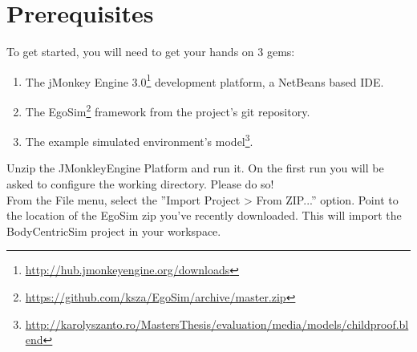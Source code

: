 \section{Prerequisites} %
\label{sec:sd_prerequisites}
To get started, you will need to get your hands on 3 gems:
\begin{enumerate}
	\item The jMonkey Engine 3.0\footnote{\url{http://hub.jmonkeyengine.org/downloads}} development platform, a NetBeans based IDE.
	\item The EgoSim\footnote{\url{https://github.com/ksza/EgoSim/archive/master.zip}} framework from the project's git repository.
	\item The example simulated environment's model\footnote{\url{http://karolyszanto.ro/MastersThesis/evaluation/media/models/childproof.blend}}.
\end{enumerate}

Unzip the JMonkleyEngine Platform and run it. On the first run you will be asked to configure the working directory. Please do so!\\

From the File menu, select the ''Import Project > From ZIP...'' option. Point to the location of the EgoSim zip you've recently downloaded. This will import the BodyCentricSim project in your workspace.
